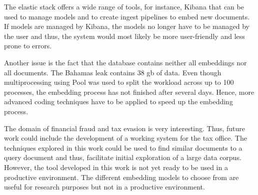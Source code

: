 The elastic stack offers a wide range of tools, for instance, Kibana that can be used to manage models and 
to create ingest pipelines to embed new documents.
If models are managed by Kibana, the models no longer have to be managed by the user and thus, 
the system would most likely be more user-friendly and less prone to errors.

Another issue is the fact that the database contains neither all embeddings nor all documents.
The Bahamas leak contains 38 \ac{gb} of data.
Even though multiprocessing using Pool was used to split the workload across up to 100 processes, 
the embedding process has not finished after several days.
Hence, more advanced coding techniques have to be applied to speed up the embedding process.

The domain of financial fraud and tax evasion is very interesting.
Thus, future work could include the development of a working system for the tax office.
The techniques explored in this work could be used to find similar documents to a query document and thus,
facilitate initial exploration of a large data corpus.
However, the tool developed in this work is not yet ready to be used in a productive environment.
The different embedding models to choose from are useful for research purposes but not in a productive environment.
